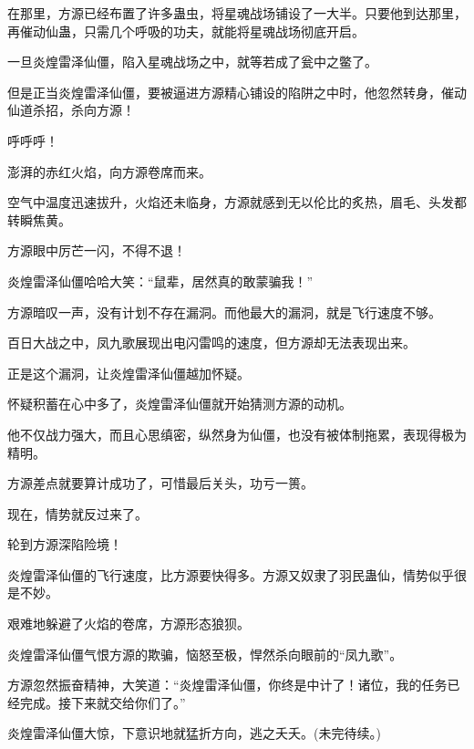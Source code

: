 \begin{this_body}
在那里，方源已经布置了许多蛊虫，将星魂战场铺设了一大半。只要他到达那里，再催动仙蛊，只需几个呼吸的功夫，就能将星魂战场彻底开启。

一旦炎煌雷泽仙僵，陷入星魂战场之中，就等若成了瓮中之鳖了。

但是正当炎煌雷泽仙僵，要被逼进方源精心铺设的陷阱之中时，他忽然转身，催动仙道杀招，杀向方源！

呼呼呼！

澎湃的赤红火焰，向方源卷席而来。

空气中温度迅速拔升，火焰还未临身，方源就感到无以伦比的炙热，眉毛、头发都转瞬焦黄。

方源眼中厉芒一闪，不得不退！

炎煌雷泽仙僵哈哈大笑：“鼠辈，居然真的敢蒙骗我！”

方源暗叹一声，没有计划不存在漏洞。而他最大的漏洞，就是飞行速度不够。

百日大战之中，凤九歌展现出电闪雷鸣的速度，但方源却无法表现出来。

正是这个漏洞，让炎煌雷泽仙僵越加怀疑。

怀疑积蓄在心中多了，炎煌雷泽仙僵就开始猜测方源的动机。

他不仅战力强大，而且心思缜密，纵然身为仙僵，也没有被体制拖累，表现得极为精明。

方源差点就要算计成功了，可惜最后关头，功亏一篑。

现在，情势就反过来了。

轮到方源深陷险境！

炎煌雷泽仙僵的飞行速度，比方源要快得多。方源又奴隶了羽民蛊仙，情势似乎很是不妙。

艰难地躲避了火焰的卷席，方源形态狼狈。

炎煌雷泽仙僵气恨方源的欺骗，恼怒至极，悍然杀向眼前的“凤九歌”。

方源忽然振奋精神，大笑道：“炎煌雷泽仙僵，你终是中计了！诸位，我的任务已经完成。接下来就交给你们了。”

炎煌雷泽仙僵大惊，下意识地就猛折方向，逃之夭夭。(未完待续。)

\end{this_body}

